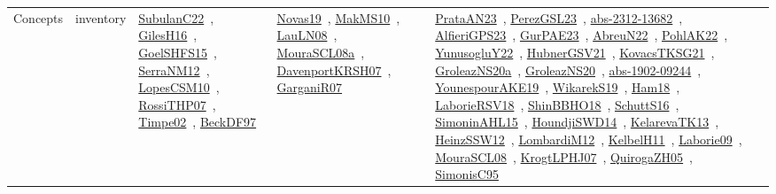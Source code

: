 {\begin{longtable}{lp{3cm}>{\raggedright\arraybackslash}p{6cm}>{\raggedright\arraybackslash}p{6cm}>{\raggedright\arraybackslash}p{8cm}}
Concepts & inventory & \href{works/SubulanC22.pdf}{SubulanC22}~\cite{SubulanC22}, \href{works/GilesH16.pdf}{GilesH16}~\cite{GilesH16}, \href{works/GoelSHFS15.pdf}{GoelSHFS15}~\cite{GoelSHFS15}, \href{works/SerraNM12.pdf}{SerraNM12}~\cite{SerraNM12}, \href{works/LopesCSM10.pdf}{LopesCSM10}~\cite{LopesCSM10}, \href{works/RossiTHP07.pdf}{RossiTHP07}~\cite{RossiTHP07}, \href{works/Timpe02.pdf}{Timpe02}~\cite{Timpe02}, \href{works/BeckDF97.pdf}{BeckDF97}~\cite{BeckDF97} & \href{works/Novas19.pdf}{Novas19}~\cite{Novas19}, \href{works/MakMS10.pdf}{MakMS10}~\cite{MakMS10}, \href{works/LauLN08.pdf}{LauLN08}~\cite{LauLN08}, \href{works/MouraSCL08a.pdf}{MouraSCL08a}~\cite{MouraSCL08a}, \href{works/DavenportKRSH07.pdf}{DavenportKRSH07}~\cite{DavenportKRSH07}, \href{works/GarganiR07.pdf}{GarganiR07}~\cite{GarganiR07} & \href{works/PrataAN23.pdf}{PrataAN23}~\cite{PrataAN23}, \href{works/PerezGSL23.pdf}{PerezGSL23}~\cite{PerezGSL23}, \href{works/abs-2312-13682.pdf}{abs-2312-13682}~\cite{abs-2312-13682}, \href{works/AlfieriGPS23.pdf}{AlfieriGPS23}~\cite{AlfieriGPS23}, \href{works/GurPAE23.pdf}{GurPAE23}~\cite{GurPAE23}, \href{works/AbreuN22.pdf}{AbreuN22}~\cite{AbreuN22}, \href{works/PohlAK22.pdf}{PohlAK22}~\cite{PohlAK22}, \href{works/YunusogluY22.pdf}{YunusogluY22}~\cite{YunusogluY22}, \href{works/HubnerGSV21.pdf}{HubnerGSV21}~\cite{HubnerGSV21}, \href{works/KovacsTKSG21.pdf}{KovacsTKSG21}~\cite{KovacsTKSG21}, \href{works/GroleazNS20a.pdf}{GroleazNS20a}~\cite{GroleazNS20a}, \href{works/GroleazNS20.pdf}{GroleazNS20}~\cite{GroleazNS20}, \href{works/abs-1902-09244.pdf}{abs-1902-09244}~\cite{abs-1902-09244}, \href{works/YounespourAKE19.pdf}{YounespourAKE19}~\cite{YounespourAKE19}, \href{works/WikarekS19.pdf}{WikarekS19}~\cite{WikarekS19}, \href{works/Ham18.pdf}{Ham18}~\cite{Ham18}, \href{works/LaborieRSV18.pdf}{LaborieRSV18}~\cite{LaborieRSV18}, \href{works/ShinBBHO18.pdf}{ShinBBHO18}~\cite{ShinBBHO18}, \href{works/SchuttS16.pdf}{SchuttS16}~\cite{SchuttS16}, \href{works/SimoninAHL15.pdf}{SimoninAHL15}~\cite{SimoninAHL15}, \href{works/HoundjiSWD14.pdf}{HoundjiSWD14}~\cite{HoundjiSWD14}, \href{works/KelarevaTK13.pdf}{KelarevaTK13}~\cite{KelarevaTK13}, \href{works/HeinzSSW12.pdf}{HeinzSSW12}~\cite{HeinzSSW12}, \href{works/LombardiM12.pdf}{LombardiM12}~\cite{LombardiM12}, \href{works/KelbelH11.pdf}{KelbelH11}~\cite{KelbelH11}, \href{works/Laborie09.pdf}{Laborie09}~\cite{Laborie09}, \href{works/MouraSCL08.pdf}{MouraSCL08}~\cite{MouraSCL08}, \href{works/KrogtLPHJ07.pdf}{KrogtLPHJ07}~\cite{KrogtLPHJ07}, \href{works/QuirogaZH05.pdf}{QuirogaZH05}~\cite{QuirogaZH05}, \href{works/SimonisC95.pdf}{SimonisC95}~\cite{SimonisC95}\\

\end{longtable}}
